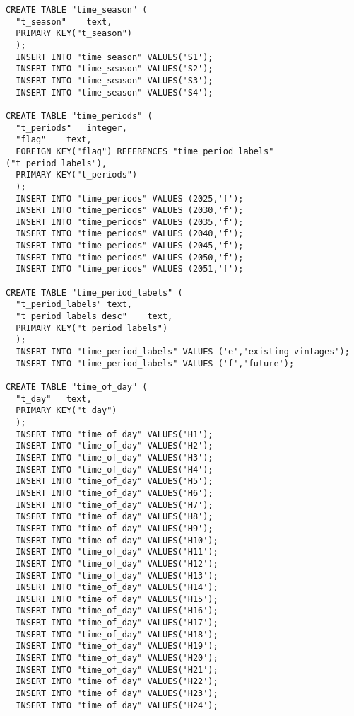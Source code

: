 \begin{lstlisting}[style=sqlstyle,caption={Temoa tables that define the model horizon and time slices.}, label={code:sql}, floatplacement=H]
CREATE TABLE "time_season" (
  "t_season"	text,
  PRIMARY KEY("t_season")
  );
  INSERT INTO "time_season" VALUES('S1');
  INSERT INTO "time_season" VALUES('S2');
  INSERT INTO "time_season" VALUES('S3');
  INSERT INTO "time_season" VALUES('S4');

CREATE TABLE "time_periods" (
  "t_periods"	integer,
  "flag"	text,
  FOREIGN KEY("flag") REFERENCES "time_period_labels"("t_period_labels"),
  PRIMARY KEY("t_periods")
  );
  INSERT INTO "time_periods" VALUES (2025,'f');
  INSERT INTO "time_periods" VALUES (2030,'f');
  INSERT INTO "time_periods" VALUES (2035,'f');
  INSERT INTO "time_periods" VALUES (2040,'f');
  INSERT INTO "time_periods" VALUES (2045,'f');
  INSERT INTO "time_periods" VALUES (2050,'f');
  INSERT INTO "time_periods" VALUES (2051,'f');

CREATE TABLE "time_period_labels" (
  "t_period_labels"	text,
  "t_period_labels_desc"	text,
  PRIMARY KEY("t_period_labels")
  );
  INSERT INTO "time_period_labels" VALUES ('e','existing vintages');
  INSERT INTO "time_period_labels" VALUES ('f','future');

CREATE TABLE "time_of_day" (
  "t_day"	text,
  PRIMARY KEY("t_day")
  );
  INSERT INTO "time_of_day" VALUES('H1');
  INSERT INTO "time_of_day" VALUES('H2');
  INSERT INTO "time_of_day" VALUES('H3');
  INSERT INTO "time_of_day" VALUES('H4');
  INSERT INTO "time_of_day" VALUES('H5');
  INSERT INTO "time_of_day" VALUES('H6');
  INSERT INTO "time_of_day" VALUES('H7');
  INSERT INTO "time_of_day" VALUES('H8');
  INSERT INTO "time_of_day" VALUES('H9');
  INSERT INTO "time_of_day" VALUES('H10');
  INSERT INTO "time_of_day" VALUES('H11');
  INSERT INTO "time_of_day" VALUES('H12');
  INSERT INTO "time_of_day" VALUES('H13');
  INSERT INTO "time_of_day" VALUES('H14');
  INSERT INTO "time_of_day" VALUES('H15');
  INSERT INTO "time_of_day" VALUES('H16');
  INSERT INTO "time_of_day" VALUES('H17');
  INSERT INTO "time_of_day" VALUES('H18');
  INSERT INTO "time_of_day" VALUES('H19');
  INSERT INTO "time_of_day" VALUES('H20');
  INSERT INTO "time_of_day" VALUES('H21');
  INSERT INTO "time_of_day" VALUES('H22');
  INSERT INTO "time_of_day" VALUES('H23');
  INSERT INTO "time_of_day" VALUES('H24');
\end{lstlisting}

